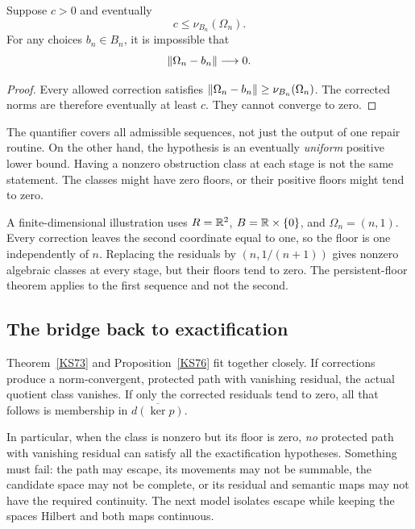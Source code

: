\begin{proposition}\label{KS77}
Suppose \(c>0\) and eventually
\[
 c\le\nu_{B_n}(\Omega_n).
\]
For any choices \(b_n\in B_n\), it is impossible that
\[
 \left\lVert\Omega_n-b_n\right\rVert\longrightarrow0.
\]
\end{proposition}
\begin{proof}
Every allowed correction satisfies
\(\left\lVert\Omega_n-b_n\right\rVert\ge\nu_{B_n}(\Omega_n)\). The corrected norms are therefore eventually at least \(c\). They cannot converge to zero.
\end{proof}
The quantifier covers all admissible sequences, not just the output of one repair routine. On the other hand, the hypothesis is an eventually \emph{uniform} positive lower bound. Having a nonzero obstruction class at each stage is not the same statement. The classes might have zero floors, or their positive floors might tend to zero.

A finite-dimensional illustration uses \(R=\mathbb R^2\), \(B=\mathbb R\times\{0\}\), and \(\Omega_n=(n,1)\). Every correction leaves the second coordinate equal to one, so the floor is one independently of \(n\). Replacing the residuals by \((n,1/(n+1))\) gives nonzero algebraic classes at every stage, but their floors tend to zero. The persistent-floor theorem applies to the first sequence and not the second.

\subsection{The bridge back to exactification}
Theorem~\ref{KS73} and Proposition~\ref{KS76} fit together closely. If corrections produce a norm-convergent, protected path with vanishing residual, the actual quotient class vanishes. If only the corrected residuals tend to zero, all that follows is membership in \(\overline{d(\ker p)}\).

In particular, when the class is nonzero but its floor is zero, \emph{no} protected path with vanishing residual can satisfy all the exactification hypotheses. Something must fail: the path may escape, its movements may not be summable, the candidate space may not be complete, or its residual and semantic maps may not have the required continuity. The next model isolates escape while keeping the spaces Hilbert and both maps continuous.

